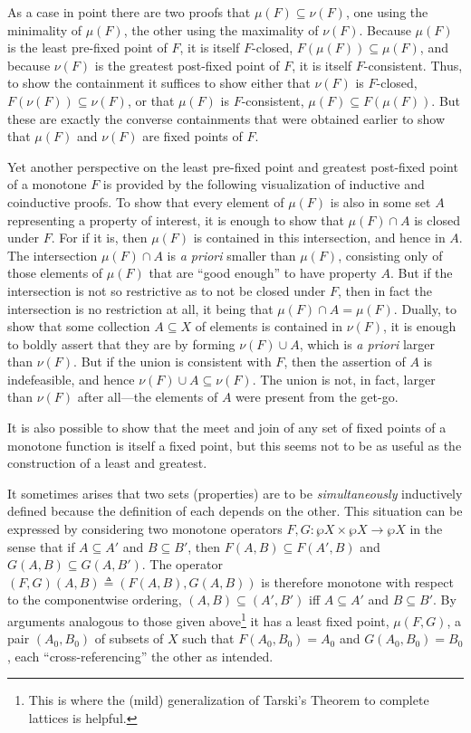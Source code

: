 \documentclass[11pt,twoside]{article}
\newcommand{\eqdef}{\mathrel{\triangleq}}
\begin{document}
As a case in point there are two proofs that $\mu(F)\subseteq\nu(F)$, one using the minimality of
$\mu(F)$, the other using the maximality of $\nu(F)$.  Because $\mu(F)$ is the least pre-fixed
point of $F$, it is itself $F$-closed, $F(\mu(F))\subseteq\mu(F)$, and because $\nu(F)$ is the greatest
post-fixed point of $F$, it is itself $F$-consistent.  Thus, to show the containment it
suffices to show either that $\nu(F)$ is $F$-closed, $F(\nu(F))\subseteq\nu(F)$, or that
$\mu(F)$ is $F$-consistent, $\mu(F)\subseteq F(\mu(F))$.  But these are exactly the converse
containments that were obtained earlier to show that $\mu(F)$ and $\nu(F)$ are fixed points of
$F$.

\smallskip

Yet another perspective on the least pre-fixed point and greatest post-fixed point of a
monotone $F$ is provided by the following visualization of inductive and coinductive
proofs.  To show that every element of $\mu(F)$ is also in some set $A$ representing a
property of interest, it is enough to show that $\mu(F)\cap A$ is closed under $F$.  For if it
is, then $\mu(F)$ is contained in this intersection, and hence in $A$.  The intersection
$\mu(F)\cap A$ is \emph{a priori} smaller than $\mu(F)$, consisting only of those elements of
$\mu(F)$ that are ``good enough'' to have property $A$.  But if the intersection is not so
restrictive as to not be closed under $F$, then in fact the intersection is no restriction
at all, it being that $\mu(F)\cap A=\mu(F)$.  Dually, to show that some collection
$A\subseteq X$ of elements is contained in $\nu(F)$, it is enough to boldly assert that they are by
forming $\nu(F)\cup A$, which is \emph{a priori} larger than $\nu(F)$.  But if the union is
consistent with $F$, then the assertion of $A$ is indefeasible, and hence
$\nu(F)\cup A\subseteq\nu(F)$.  The union is not, in fact, larger than $\nu(F)$ after all---the elements of
$A$ were present from the get-go.

\smallskip

It is also possible to show that the meet and join of any set of fixed points of a
monotone function is itself a fixed point, but this seems not to be as useful as the
construction of a least and greatest.

\smallskip

It sometimes arises that two sets (properties) are to be \emph{simultaneously} inductively
defined because the definition of each depends on the other.  This situation can be
expressed by considering two monotone operators $F, G : \wp{X}\times\wp{X}\to\wp{X}$ in the sense that
if $A\subseteq A'$ and $B\subseteq B'$, then $F(A,B)\subseteq F(A',B)$ and
$G(A,B)\subseteq G(A,B')$.  The operator $(F,G)(A,B)\eqdef (F(A,B),G(A,B))$ is therefore monotone
with respect to the componentwise ordering, $(A,B)\subseteq (A',B')$ iff $A\subseteq A'$ and
$B\subseteq B'$.  By arguments analogous to those given above\footnote{This is where the (mild)
  generalization of Tarski's Theorem to complete lattices is helpful.} it has a least
fixed point, $\mu(F, G)$, a pair $(A_{0},B_{0})$ of subsets of $X$ such that
$F(A_{0},B_{0})=A_{0}$ and $G(A_{0},B_{0})=B_{0}$, each ``cross-referencing'' the other as
intended.
\end{document}
